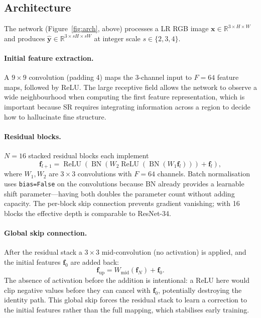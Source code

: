 \documentclass{article}
\begin{document}
\subsection{Architecture}

The network (Figure~\ref{fig:arch}, above) processes a LR RGB image
$\mathbf{x} \in \mathbb{R}^{3 \times H \times W}$ and produces
$\hat{\mathbf{y}} \in \mathbb{R}^{3 \times sH \times sW}$ at integer scale
$s \in \{2,3,4\}$.

\paragraph{Initial feature extraction.}
A $9{\times}9$ convolution (padding 4) maps the 3-channel input to
$F=64$ feature maps, followed by ReLU.
The large receptive field allows the network to observe a wide neighbourhood
when computing the first feature representation, which is important because
SR requires integrating information across a region to decide how to
hallucinate fine structure.

\paragraph{Residual blocks.}
$N=16$ stacked residual blocks each implement
\begin{equation}
  \mathbf{f}_{l+1} = \operatorname{ReLU}\!\left(
    \operatorname{BN}\!\left(
      W_2 \operatorname{ReLU}\!\left(
        \operatorname{BN}(W_1 \mathbf{f}_l)
      \right)
    \right)
    + \mathbf{f}_l
  \right),
\end{equation}
where $W_1, W_2$ are $3{\times}3$ convolutions with $F=64$ channels.
Batch normalisation uses \texttt{bias=False} on the convolutions because BN
already provides a learnable shift parameter---having both doubles the
parameter count without adding capacity.
The per-block skip connection prevents gradient vanishing; with 16 blocks the
effective depth is comparable to ResNet-34.

\paragraph{Global skip connection.}
After the residual stack a $3{\times}3$ mid-convolution (no activation) is
applied, and the initial features $\mathbf{f}_0$ are added back:
\begin{equation}
  \mathbf{f}_{\text{up}} = W_{\text{mid}}\!\left(\mathbf{f}_N\right) + \mathbf{f}_0.
\end{equation}
The absence of activation before the addition is intentional: a ReLU here
would clip negative values before they can cancel with $\mathbf{f}_0$, potentially
destroying the identity path.
This global skip forces the residual stack to learn a correction to the
initial features rather than the full mapping, which stabilises early training.
\end{document}

